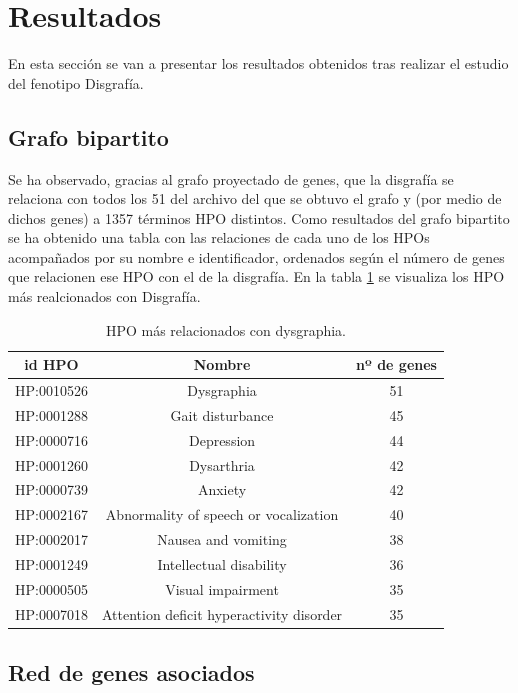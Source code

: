 \section{Resultados}

En esta sección se van a presentar los resultados obtenidos tras realizar el estudio del fenotipo Disgrafía.

\subsection{Grafo bipartito}

Se ha observado, gracias al grafo proyectado de genes, que la disgrafía se relaciona con todos los 51 del archivo del que se obtuvo el grafo y (por medio de dichos genes) a 1357 términos HPO distintos. Como resultados del grafo bipartito se ha obtenido una tabla con las relaciones de cada uno de los HPOs acompañados por su nombre e identificador, ordenados según el número de genes que relacionen ese HPO con el de la disgrafía. En la tabla \ref{tab:dysgraphia-relaciones} se visualiza los HPO más realcionados con Disgrafía.

\begin{table}[h]
	\caption{HPO más relacionados con dysgraphia.}
	\label{tab:dysgraphia-relaciones}
	\centering
	\begin{tabular}{|c|c|c|}
		\hline
		\textbf{id HPO} & \textbf{Nombre} & \textbf{nº de genes} \\
		\hline
		HP:0010526 & Dysgraphia & 51 \\
		HP:0001288 & Gait disturbance & 45 \\
		HP:0000716 & Depression & 44 \\
		HP:0001260 & Dysarthria & 42 \\
		HP:0000739 & Anxiety & 42 \\
		HP:0002167 & Abnormality of speech or vocalization & 40 \\
		HP:0002017 & Nausea and vomiting & 38 \\
		HP:0001249 & Intellectual disability & 36 \\
		HP:0000505 & Visual impairment & 35 \\
		HP:0007018 & Attention deficit hyperactivity disorder & 35 \\
		\hline
	\end{tabular}

\end{table}


\subsection{Red de genes asociados}

